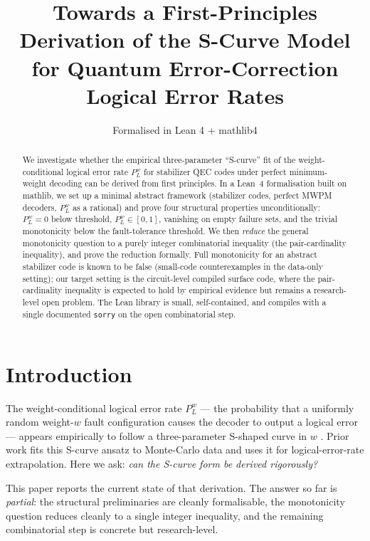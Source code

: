 \documentclass[11pt]{article}
\title{Towards a First-Principles Derivation of the S-Curve Model \\
       for Quantum Error-Correction Logical Error Rates}
\author{Formalised in Lean 4 + mathlib4}
\theoremstyle{definition}
\theoremstyle{remark}
\begin{document}
\maketitle

\begin{abstract}
We investigate whether the empirical three-parameter ``S-curve''
fit of the weight-conditional logical error rate $P_L^w$ for
stabilizer QEC codes under perfect minimum-weight decoding can be
derived from first principles.  In a Lean~4 formalisation built on
mathlib, we set up a minimal abstract framework (stabilizer codes,
perfect MWPM decoders, $P_L^w$ as a rational) and prove four
structural properties unconditionally: $P_L^w = 0$ below threshold,
$P_L^w \in [0, 1]$, vanishing on empty failure sets, and the trivial
monotonicity below the fault-tolerance threshold.  We then
\emph{reduce} the general monotonicity question to a purely integer
combinatorial inequality (the pair-cardinality inequality), and
prove the reduction formally.  Full monotonicity for an abstract
stabilizer code is known to be false (small-code counterexamples in
the data-only setting); our target setting is the circuit-level
compiled surface code, where the pair-cardinality inequality is
expected to hold by empirical evidence but remains a research-level
open problem.  The Lean library is small, self-contained, and
compiles with a single documented \texttt{sorry} on the open
combinatorial step.
\end{abstract}

\section{Introduction}

The weight-conditional logical error rate $P_L^w$ --- the probability
that a uniformly random weight-$w$ fault configuration causes the
decoder to output a logical error --- appears empirically to follow
a three-parameter S-shaped curve in $w$ \cite{ScaLER}.  Prior work
fits this S-curve ansatz to Monte-Carlo data and uses it for
logical-error-rate extrapolation.  Here we ask: \emph{can the
S-curve form be derived rigorously?}

This paper reports the current state of that derivation.  The
answer so far is \emph{partial}: the structural preliminaries are
cleanly formalisable, the monotonicity question reduces cleanly to
a single integer inequality, and the remaining combinatorial step
is concrete but research-level.
\end{document}
